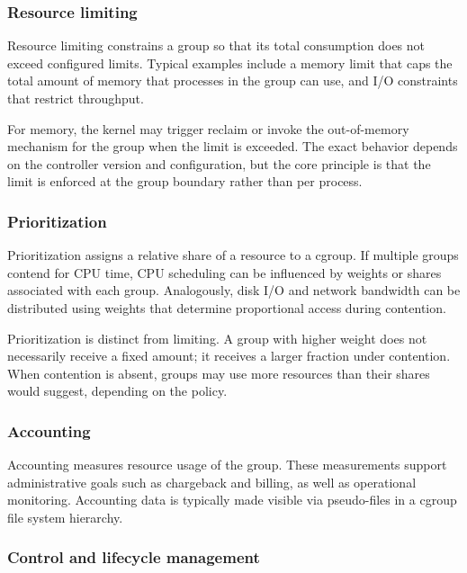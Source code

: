 \documentclass[11pt,a4paper,openany]{report}
\begin{document}
\subsubsection*{Resource limiting}

Resource limiting constrains a group so that its total consumption does not exceed configured limits. Typical examples include a memory limit that caps the total amount of memory that processes in the group can use, and I/O constraints that restrict throughput.

For memory, the kernel may trigger reclaim or invoke the out-of-memory mechanism for the group when the limit is exceeded. The exact behavior depends on the controller version and configuration, but the core principle is that the limit is enforced at the group boundary rather than per process.

\subsubsection*{Prioritization}

Prioritization assigns a relative share of a resource to a cgroup. If multiple groups contend for CPU time, CPU scheduling can be influenced by weights or shares associated with each group. Analogously, disk I/O and network bandwidth can be distributed using weights that determine proportional access during contention.

Prioritization is distinct from limiting. A group with higher weight does not necessarily receive a fixed amount; it receives a larger fraction under contention. When contention is absent, groups may use more resources than their shares would suggest, depending on the policy.

\subsubsection*{Accounting}

Accounting measures resource usage of the group. These measurements support administrative goals such as chargeback and billing, as well as operational monitoring. Accounting data is typically made visible via pseudo-files in a cgroup file system hierarchy.

\subsubsection*{Control and lifecycle management}
\end{document}

